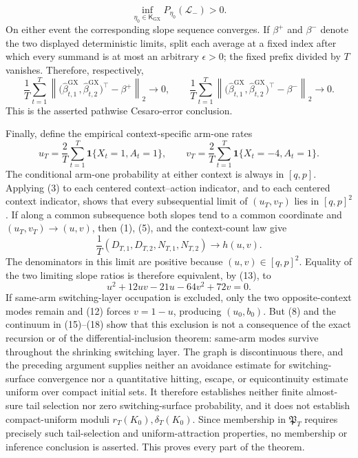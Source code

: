 \[
 \inf_{\eta_0\in\mathsf K_{\mathrm{GX}}}P_{\eta_0}(\mathcal L_-)>0. \tag{25}
\]
On either event the corresponding slope sequence converges. If \(\beta^+\) and \(\beta^-\) denote the two displayed deterministic limits, split each average at a fixed index after which every summand is at most an arbitrary \(\epsilon>0\); the fixed prefix divided by \(T\) vanishes. Therefore, respectively,
\[
 \frac1T\sum_{t=1}^T\left\|\bigl(\widehat\beta^{\mathrm{GX}}_{t,1},\widehat\beta^{\mathrm{GX}}_{t,2}\bigr)^\top-\beta^+\right\|_2\longrightarrow0,
 \qquad
 \frac1T\sum_{t=1}^T\left\|\bigl(\widehat\beta^{\mathrm{GX}}_{t,1},\widehat\beta^{\mathrm{GX}}_{t,2}\bigr)^\top-\beta^-\right\|_2\longrightarrow0.
\]
This is the asserted pathwise Cesaro-error conclusion.

Finally, define the empirical context-specific arm-one rates
\[
 u_T=\frac2T\sum_{t=1}^T\mathbf1\{X_t=1,A_t=1\},\qquad
 v_T=\frac2T\sum_{t=1}^T\mathbf1\{X_t=-4,A_t=1\}.
\]
The conditional arm-one probability at either context is always in \([q,p]\). Applying (3) to each centered context--action indicator, and to each centered context indicator, shows that every subsequential limit of \((u_T,v_T)\) lies in \([q,p]^2\). If along a common subsequence both slopes tend to a common coordinate and \((u_T,v_T)\to(u,v)\), then (1), (5), and the context-count law give
\[
 \frac1T(D_{T,1},D_{T,2},N_{T,1},N_{T,2})\longrightarrow h(u,v).
\]
The denominators in this limit are positive because \((u,v)\in[q,p]^2\). Equality of the two limiting slope ratios is therefore equivalent, by (13), to
\[
 u^2+12uv-21u-64v^2+72v=0.
\]
If same-arm switching-layer occupation is excluded, only the two opposite-context modes remain and (12) forces \(v=1-u\), producing \((u_0,b_0)\). But (8) and the continuum in (15)--(18) show that this exclusion is not a consequence of the exact recursion or of the differential-inclusion theorem: same-arm modes survive throughout the shrinking switching layer. The graph is discontinuous there, and the preceding argument supplies neither an avoidance estimate for switching-surface convergence nor a quantitative hitting, escape, or equicontinuity estimate uniform over compact initial sets. It therefore establishes neither finite almost-sure tail selection nor zero switching-surface probability, and it does not establish compact-uniform moduli \(r_T(K_0),\delta_T(K_0)\). Since membership in \(\mathfrak P_T\) requires precisely such tail-selection and uniform-attraction properties, no membership or inference conclusion is asserted. This proves every part of the theorem.